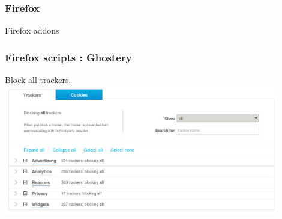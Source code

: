 \begin{frame}
\frametitle{Firefox}
\begin{center}
\huge{Firefox addons}
\end{center}
\end{frame}

\begin{frame}
\frametitle{Firefox scripts : Ghostery}
Block all trackers.\\
\includegraphics[width=0.9\textwidth]{./materials/ghostery}
\end{frame}

